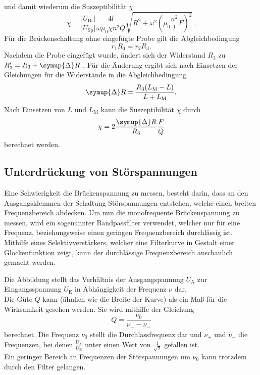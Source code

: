     und damit wiederum die Suszeptibilität $\chi$
    \begin{equation}
        \chi = \frac{\lvert U_\text{Br} \rvert}{\lvert U_\text{Sp} \rvert} \frac{4l}{\omega \mu_0 \chi n^2 Q} \sqrt{R^2 + {\omega}^2(\mu_0 \frac{n^2}{l}F)^2} \ . \label{eqn:SusU}
    \end{equation}
    Für die Brückenschaltung ohne eingefügte Probe gilt die Abgleichbedingung
    \begin{equation}
        r_1 R_4 = r_2 R_3 .
    \end{equation}
    Nachdem die Probe eingefügt wurde,
    ändert sich der Widerstand $R_3$ zu $R'_3 = R_3 + \symup{\Delta}R$ .
    Für die Änderung ergibt sich nach Einsetzen der Gleichungen für die Widerstände in die Abgleichbedingung 
    \begin{equation}
        \symup{\Delta}R = \frac{R_3 (L_\text{M} - L)}{L + L_\text{M}} .
    \end{equation}
    Nach Einsetzen von $L$ und $L_\text{M}$ kann die Suszeptibilität $\chi$ durch
    \begin{equation}
        \chi = 2 \frac{\symup{\Delta}R}{R_3} \frac{F}{Q} \label{eqn:SusR}
    \end{equation}
    berechnet werden.

\subsection{Unterdrückung von Störspannungen}
    
    Eine Schwierigkeit die Brückenspannung zu messen, 
    besteht darin,
    dass an den Ausgangsklemmen der Schaltung Störspannungen entstehen,
    welche einen breiten Frequenzbereich abdecken.
    Um nun die monofrequente Brückenspannung zu messen,
    wird ein sogenannter Bandpassfilter verwendet,
    welcher nur für eine Frequenz,
    beziehungsweise einen geringen Frequenzbereich durchlässig ist.
    Mithilfe eines Selektivverstärkers,
    welcher eine Filterkurve in Gestalt einer Glockenfunktion zeigt,
    kann der durchlässige Frequenzbereich anschaulich gemacht werden.

    Die Abbildung %
    stellt das Verhältnis der Ausgangspannung $U_\text{A}$ zur Eingangsspannung $U_\text{E}$ in Abhängigkeit der Frequenz $\nu$ dar.\\
    Die Güte $Q$ kann (ähnlich wie die Breite der Kurve) als ein Maß für die Wirksamkeit gesehen werden.
    Sie wird mithilfe der Gleichung
    \begin{equation}
        Q = \frac{\nu_0}{\nu_+ - \nu_-}
    \end{equation}
    berechnet.
    Die Frequenz $\nu_0$ stellt die Durchlassfrequenz dar und $\nu_+$ und $\nu_-$ die Frequenzen,
    bei denen $\frac{U_\text{A}}{U_\text{E}}$ unter einen Wert von $\frac{1}{\sqrt{2}}$ gefallen ist.\\
    Ein geringer Bereich an Frequenzen der Störspannungen um $\nu_0$ kann trotzdem durch den Filter gelangen.
    
